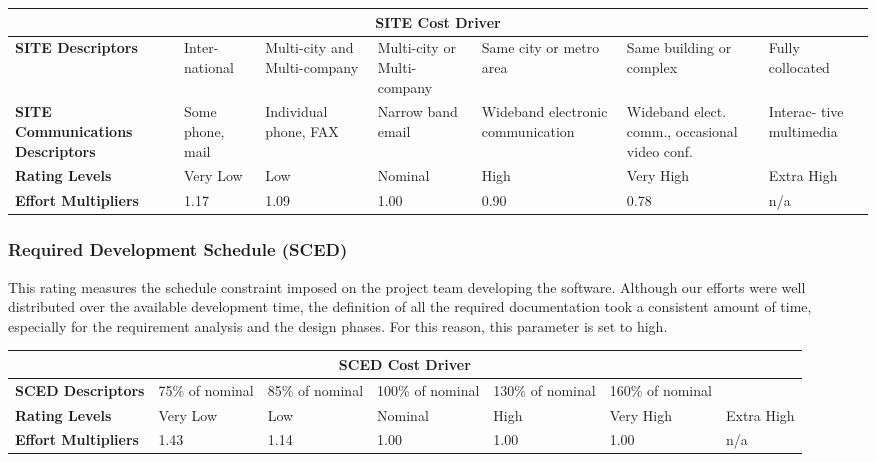\begin{table}[H]
	\centering
	\begin{tabular}{| m{1.8cm} | m{1.1cm} | m{1.7cm} | m{1.5cm} | m{1.7cm} | m{2cm} | m{1.2cm} | }
		\hline
		\multicolumn{7}{|c|}{ \textbf{SITE Cost Driver} } \\
		\hline
		\hline
		\textbf{SITE Descriptors} & Inter- national & Multi-city and Multi-company & Multi-city or Multi-company & Same city or metro area & Same building or complex & Fully collocated\\
		\hline
		\textbf{SITE Communications Descriptors} & Some phone, mail & Individual phone, FAX & Narrow band email & Wideband electronic communication & Wideband elect. comm., occasional video conf. & Interac- tive multimedia\\
		\hline
		\textbf{Rating Levels} & Very Low & Low & Nominal & High & Very High & Extra High \\
		\hline
		\textbf{Effort Multipliers} & 1.17 & 1.09 & 1.00 & 0.90 & 0.78 & n/a \\ 
		\hline
	\end{tabular}
\end{table}
\newpage
\subsubsection*{Required Development Schedule (SCED)}
This rating measures the schedule constraint imposed on the project team developing the software. Although our efforts were well distributed over the available development time, the definition of all the required documentation took a consistent amount of time, especially for the requirement analysis and the design phases. For this reason, this parameter is set to high.

\begin{table}[H]
	\centering
	\begin{tabular}{| m{1.8cm} | m{1.5cm} | m{1.5cm} | m{1.5cm} | m{1.5cm} | m{1.8cm} | m{1cm} | }
		\hline
		\multicolumn{7}{|c|}{ \textbf{SCED Cost Driver} } \\
		\hline
		\hline
		\textbf{SCED Descriptors} & 75\% of nominal & 85\% of nominal & 100\% of nominal & 130\% of nominal & 160\% of nominal & \\
		\hline
		\textbf{Rating Levels} & Very Low & Low & Nominal & High & Very High & Extra High \\
		\hline
		\textbf{Effort Multipliers} & 1.43 & 1.14 & 1.00 & 1.00 & 1.00 & n/a \\ 
		\hline
	\end{tabular}
\end{table}

